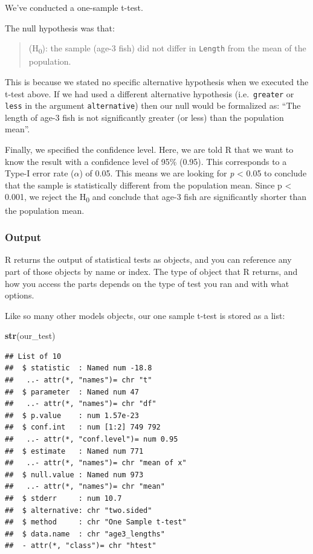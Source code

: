 \documentclass[
]{book}
\newenvironment{Shaded}{\begin{snugshade}}{\end{snugshade}}
\newcommand{\KeywordTok}[1]{\textcolor[rgb]{0.13,0.29,0.53}{\textbf{#1}}}
\newcommand{\NormalTok}[1]{#1}
\begin{document}
We've conducted a one-sample t-test.

The null hypothesis was that:

\begin{quote}
(H\textsubscript{0}): the sample (age-3 fish) did not differ in \texttt{Length} from the mean of the population.
\end{quote}

This is because we stated no specific alternative hypothesis when we executed the t-test above. If we had used a different alternative hypothesis (i.e.~\texttt{greater} or \texttt{less} in the argument \texttt{alternative}) then our null would be formalized as: ``The length of age-3 fish is not significantly greater (or less) than the population mean''.

Finally, we specified the confidence level. Here, we are told R that we want to know the result with a confidence level of 95\% (0.95). This corresponds to a Type-I error rate (\(\alpha\)) of 0.05. This means we are looking for \emph{p} \textless{} 0.05 to conclude that the sample is statistically different from the population mean. Since p \textless{} 0.001, we reject the H\textsubscript{0} and conclude that age-3 fish are significantly shorter than the population mean.

\hypertarget{output}{%
\subsubsection{Output}\label{output}}

R returns the output of statistical tests as objects, and you can reference any part of those objects by name or index. The type of object that R returns, and how you access the parts depends on the type of test you ran and with what options.

Like so many other models objects, our one sample t-test is stored as a list:

\begin{Shaded}
\begin{Highlighting}[]
\KeywordTok{str}\NormalTok{(our_test)}
\end{Highlighting}
\end{Shaded}

\begin{verbatim}
## List of 10
##  $ statistic  : Named num -18.8
##   ..- attr(*, "names")= chr "t"
##  $ parameter  : Named num 47
##   ..- attr(*, "names")= chr "df"
##  $ p.value    : num 1.57e-23
##  $ conf.int   : num [1:2] 749 792
##   ..- attr(*, "conf.level")= num 0.95
##  $ estimate   : Named num 771
##   ..- attr(*, "names")= chr "mean of x"
##  $ null.value : Named num 973
##   ..- attr(*, "names")= chr "mean"
##  $ stderr     : num 10.7
##  $ alternative: chr "two.sided"
##  $ method     : chr "One Sample t-test"
##  $ data.name  : chr "age3_lengths"
##  - attr(*, "class")= chr "htest"
\end{verbatim}
\end{document}
